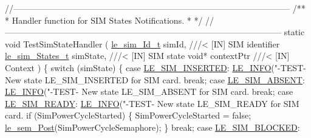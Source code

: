\begin{DoxyCodeInclude}
\textcolor{comment}{//--------------------------------------------------------------------------------------------------}\textcolor{comment}{}
\textcolor{comment}{/**}
\textcolor{comment}{ * Handler function for SIM States Notifications.}
\textcolor{comment}{ *}
\textcolor{comment}{ */}
\textcolor{comment}{//--------------------------------------------------------------------------------------------------}
\textcolor{keyword}{static} \textcolor{keywordtype}{void} TestSimStateHandler
(
    \hyperlink{le__sim__interface_8h_aace49df88426119626fb1ef4e544ccdd}{le\_sim\_Id\_t}     simId,       \textcolor{comment}{///< [IN] SIM identifier}
\textcolor{comment}{}    \hyperlink{le__sim__interface_8h_a21b9bb7d5e5e7ece213e00738a5bae41}{le\_sim\_States\_t} simState,    \textcolor{comment}{///< [IN] SIM state}
\textcolor{comment}{}    \textcolor{keywordtype}{void}*           contextPtr   \textcolor{comment}{///< [IN] Context}
\textcolor{comment}{})
\{
    \textcolor{keywordflow}{switch} (simState)
    \{
        \textcolor{keywordflow}{case} \hyperlink{le__sim__interface_8h_a21b9bb7d5e5e7ece213e00738a5bae41a86aea853ae5fcc1a2e3c8d352d8689d3}{LE\_SIM\_INSERTED}:
            \hyperlink{le__log_8h_a23e6d206faa64f612045d688cdde5808}{LE\_INFO}(\textcolor{stringliteral}{"-TEST- New state LE\_SIM\_INSERTED for SIM card.%
            \textcolor{keywordflow}{break};
        \textcolor{keywordflow}{case} \hyperlink{le__sim__interface_8h_a21b9bb7d5e5e7ece213e00738a5bae41a813e26946372fbc3960aa97713b6ca2f}{LE\_SIM\_ABSENT}:
            \hyperlink{le__log_8h_a23e6d206faa64f612045d688cdde5808}{LE\_INFO}(\textcolor{stringliteral}{"-TEST- New state LE\_SIM\_ABSENT for SIM card.%
            \textcolor{keywordflow}{break};
        \textcolor{keywordflow}{case} \hyperlink{le__sim__interface_8h_a21b9bb7d5e5e7ece213e00738a5bae41aa7f1f6c3391e32af8ce3ba2242276d64}{LE\_SIM\_READY}:
            \hyperlink{le__log_8h_a23e6d206faa64f612045d688cdde5808}{LE\_INFO}(\textcolor{stringliteral}{"-TEST- New state LE\_SIM\_READY for SIM card.%
            \textcolor{keywordflow}{if} (SimPowerCycleStarted)
            \{
                SimPowerCycleStarted = \textcolor{keyword}{false};
                \hyperlink{le__semaphore_8h_abb859411cc58fbcc576c986ef52083b2}{le\_sem\_Post}(SimPowerCycleSemaphore);
            \}
            \textcolor{keywordflow}{break};
        \textcolor{keywordflow}{case} \hyperlink{le__sim__interface_8h_a21b9bb7d5e5e7ece213e00738a5bae41af83b91131d516ad3756781108000515a}{LE\_SIM\_BLOCKED}:
}}}
\end{DoxyCodeInclude}
